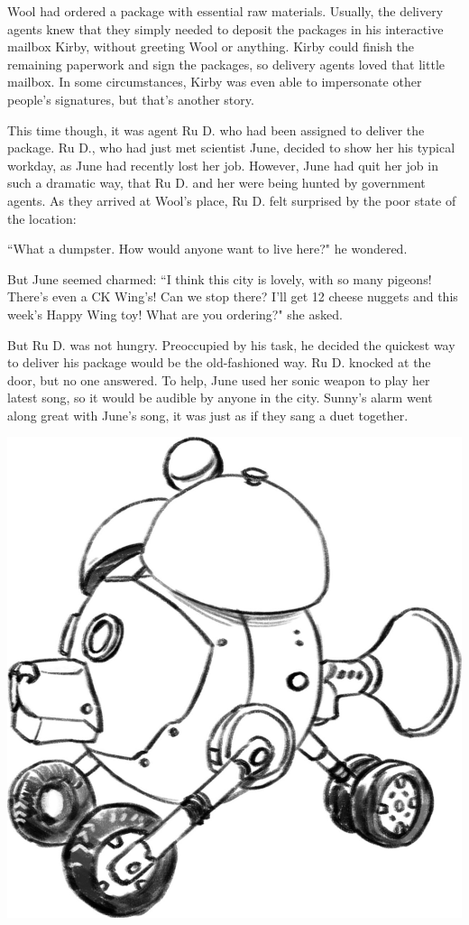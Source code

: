 Wool had ordered a package with essential raw materials.
Usually, the delivery agents knew that they simply needed to deposit the packages in his interactive mailbox Kirby, without greeting Wool or anything. Kirby could finish the remaining paperwork and sign the packages, so delivery agents loved that little mailbox. In some circumstances, Kirby was even able to impersonate other people's signatures, but that's another story.


This time though, it was agent Ru D. who had been assigned to deliver the package. 
Ru D., who had just met scientist June, decided to show her his typical workday, as June had recently lost her job.
However, June had quit her job in such a dramatic way, that Ru D. and her were being hunted by government agents.
As they arrived at Wool's place, Ru D. felt surprised by the poor state of the location: 

``What a dumpster. How would anyone want to live here?" he wondered. 

But June seemed charmed: ``I think this city is lovely, with so many pigeons! There's even a CK Wing's! Can we stop there? I'll get 12 cheese nuggets and this week's Happy Wing toy! What are you ordering?" she asked.

But Ru D. was not hungry. Preoccupied by his task, he decided the quickest way to deliver his package would be the old-fashioned way. 
Ru D. knocked at the door, but no one answered. To help, June used her sonic weapon to play her latest song, so it would be audible by anyone in the city.
Sunny's alarm went along great with June's song, it was just as if they sang a duet together.

\begin{center}
    \includegraphics[height=.2\textheight]{Assets/wfbw_sunny}    
\end{center}


